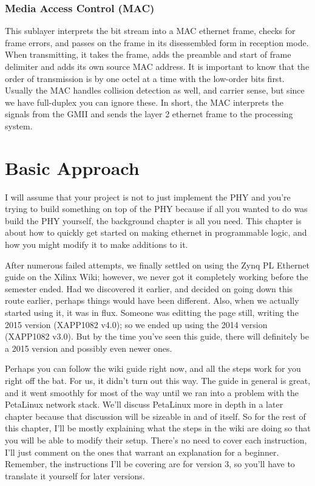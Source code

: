 \documentclass[12pt]{report}
\begin{document}
\subsection{Media Access Control (MAC)}
This sublayer interprets the bit stream into a MAC ethernet frame, checks for frame errors, and passes on the frame in its disessembled form in reception mode. When transmitting, it takes the frame, adds the preamble and start of frame delimiter and adds its own source MAC address. It is important to know that the order of transmission is by one octel at a time with the low-order bits first. Usually the MAC handles collision detection as well, and carrier sense, but since we have full-duplex you can ignore these. In short, the MAC interprets the signals from the GMII and sends the layer 2 ethernet frame to the processing system.

\chapter{Basic Approach}
I will assume that your project is not to just implement the PHY and you're trying to build something on top of the PHY because if all you wanted to do was build the PHY yourself, the background chapter is all you need. This chapter is about how to quickly get started on making ethernet in programmable logic, and how you might modify it to make additions to it.

After numerous failed attempts, we finally settled on using the Zynq PL Ethernet \cite{zynq_pl_eth} guide on the Xilinx Wiki; however, we never got it completely working before the semester ended. Had we discovered it earlier, and decided on going down this route earlier, perhaps things would have been different. Also, when we actually started using it, it was in flux. Someone was editting the page still, writing the 2015 version (XAPP1082 v4.0); so we ended up using the 2014 version (XAPP1082 v3.0). But by the time you've seen this guide, there will definitely be a 2015 version and possibly even newer ones.

Perhaps you can follow the wiki guide right now, and all the steps work for you right off the bat.
For us, it didn't turn out this way.
The guide in general is great, and it went smoothly for most of the way until we ran into a problem with the PetaLinux network stack.
We'll discuss PetaLinux more in depth in a later chapter because that discussion will be sizeable in and of itself. So for the rest of this chapter, I'll be mostly explaining what the steps in the wiki are doing so that you will be able to modify their setup. There's no need to cover each instruction, I'll just comment on the ones that warrant an explanation for a beginner. Remember, the instructions I'll be covering are for version 3, so you'll have to translate it yourself for later versions.
\end{document}

